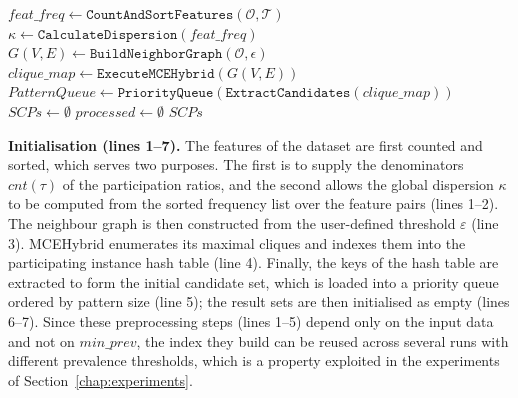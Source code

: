 \documentclass[12pt, letterpaper]{template}
\theoremstyle{definition}
\begin{document}
\begin{algorithm}[!ht]
\SetAlgoLined
{}
$feat\_freq \leftarrow \texttt{CountAndSortFeatures}(\mathcal{O}, \mathcal{T})$\;
$\kappa \leftarrow \texttt{CalculateDispersion}(feat\_freq)$\;
$G(V, E) \leftarrow \texttt{BuildNeighborGraph}(\mathcal{O},\epsilon)$\;
$clique\_map \leftarrow \texttt{ExecuteMCEHybrid}(G(V,E))$\;
$PatternQueue \leftarrow \texttt{PriorityQueue}(\texttt{ExtractCandidates}(clique\_map))$\;
$SCPs \leftarrow \emptyset$\;
$processed \leftarrow \emptyset$\;
\Return $SCPs$\;
\caption{MCR Colocation Mining}
\label{alg:mcr}
\end{algorithm}
\FloatBarrier

\noindent\textbf{Initialisation (lines 1--7).}
The features of the dataset are first counted and sorted, which serves two purposes. The first is to
supply the denominators $cnt(\tau)$ of the participation ratios, and the second allows the global
dispersion $\kappa$ to be computed from the sorted frequency list over the
feature pairs (lines 1--2). The neighbour graph is then constructed from the user-defined
threshold $\varepsilon$ (line 3). MCEHybrid enumerates its maximal cliques and indexes them into the
participating instance hash table (line 4). Finally, the keys of
the hash table are extracted to form the initial candidate set, which is loaded into a
priority queue ordered by pattern size (line 5); the result sets are then initialised as empty
(lines 6--7). Since these preprocessing steps (lines 1--5) depend only on
the input data and not on $min\_prev$, the index they build can be reused across several runs
with different prevalence thresholds, which is a property exploited in the experiments of Section~\ref{chap:experiments}.
\end{document}
